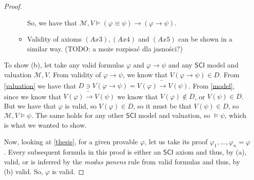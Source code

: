 \documentclass{article}
\theoremstyle{definition}
\theoremstyle{definition}
\newcommand*{\id}{\equiv}
\newcommand*{\ra}{\rightarrow}
\newcommand{\SCI}{$\mathsf{SCI}$\xspace}
\begin{document}
\begin{proof}
\begin{itemize}
\begin{itemize}
                        So, we have that $\mathcal{M}, V \models (\varphi \id \psi) \ra (\varphi \ra
                            \psi)$.

                  \item Validity of axioms $(Ax3), (Ax4)$ and $(Ax5)$ can be shown in a similar way.
                        (TODO: a może rozpisać dla jasności?)
              \end{itemize}
    \end{itemize}

    To show (b), let take any valid formulas $\varphi$ and $\varphi \ra \psi$ and
    any \SCI model and valuation $\mathcal{M}, V$. From validity of $\varphi \ra
        \psi$, we know that $V(\varphi \ra \psi) \in D$. From \cref{valuation} we have
    that $D \ni V(\varphi \ra \psi) = V(\varphi) \tilde{\ra} V(\psi)$. From
    \cref{model}, since we know that $V(\varphi) \tilde{\ra} V(\psi)$ we know that
    $V(\varphi) \not \in D$, or $V(\psi) \in D$. But we have that $\varphi$ is
    valid, so $V(\varphi) \in D$, so it must be that $V(\psi) \in D$, so
    $\mathcal{M}, V \models \psi$. The same holds for any other \SCI model and
    valuation, so $\models \psi$, which is what we wanted to show.

    Now, looking at \cref{thesis}, for a given provable $\varphi$, let us take its
    proof $\varphi_1, ..., \varphi_n = \varphi$. Every subsequent formula in this
    proof is either an \SCI axiom and thus, by (a), valid, or is inferred by the
    \emph{modus ponens} rule from valid formulas and thus, by (b) valid. So,
    $\varphi$ is valid.
\end{proof}
\end{document}
